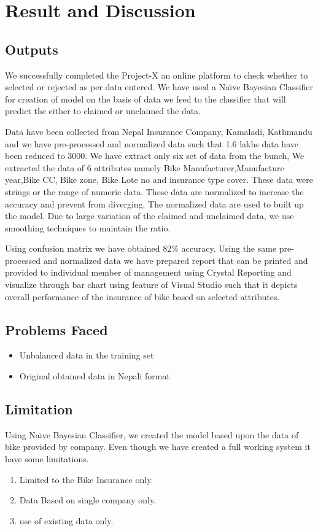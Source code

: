\chapter{Result and Discussion}
\section{Outputs}
We successfully completed the Project-X an online platform to check whether to selected or rejected as per data entered. We have used a Na\"{\i}ve Bayesian Classifier for creation of model on the basis  of data we feed to the classifier that will predict the either to claimed or unclaimed the data.
\par
Data have been collected from Nepal Insurance Company, Kamaladi, Kathmandu and we have pre-processed and normalized data such that 1.6 lakhs data have been reduced to 3000. We have extract only six set of data from the bunch, We extracted the data of 6 attributes namely Bike Manufacturer,Manufacture year,Bike CC, Bike zone, Bike Lote no and insurance type cover. These data were strings or the range of numeric data. These data are normalized to increase the accuracy and prevent from diverging.
The normalized data are used to built up the  model. Due to large variation of the claimed and unclaimed data, we use smoothing techniques to maintain the ratio.

\par
Using confusion matrix we have obtained 82\% accuracy. Using the same pre-processed and normalized data we have prepared report that can be printed and provided to individual member of management using Crystal Reporting and visualize through bar chart using feature of Visual Studio such that it depicts overall performance of the insurance of bike based on selected attributes.


\newpage
\section{Problems Faced}
\begin{itemize}
\item Unbalanced data in the training set
\item Original obtained data in Nepali format

\end{itemize}

\section{Limitation}
Using Na\"{\i}ve Bayesian Classifier, we created the model based upon the data of bike provided by company. Even though we have created a full working system it have some limitations.
\begin{enumerate}
\item Limited to the Bike Insurance only.
\item Data Based on single company only.
\item use of existing data only.
\end{enumerate}


